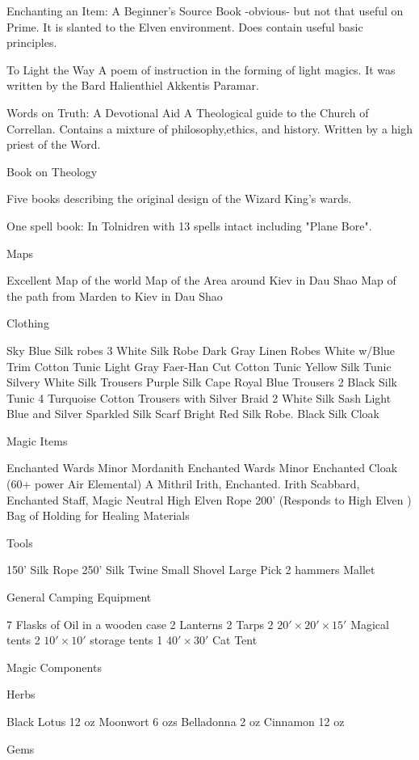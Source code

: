 Enchanting an Item: A Beginner's Source Book
-obvious- but not that
useful on Prime. It is slanted to the  Elven environment. Does
contain useful basic principles.

To Light the Way
A poem of instruction in the forming of light magics. It was written
by the Bard Halienthiel Akkentis Paramar.

Words on Truth: A Devotional Aid
A Theological guide to the Church
of Correllan. Contains a mixture of philosophy,ethics, and history. Written
by a high priest of the Word.

Book on Theology


Five books describing the original design of the Wizard King's
wards.

One spell book: In Tolnidren with 13 spells intact including 
"Plane Bore".

Maps


Excellent Map of the world
Map of the Area around Kiev in Dau Shao
Map of the path from Marden to Kiev in Dau Shao


Clothing


Sky Blue Silk robes  3
White Silk Robe
Dark Gray Linen Robes
White w/Blue Trim Cotton Tunic
Light Gray Faer-Han Cut Cotton Tunic
Yellow Silk Tunic
Silvery White Silk Trousers
Purple Silk Cape
Royal Blue Trousers  2
Black Silk Tunic  4
Turquoise Cotton Trousers with Silver Braid  2
White Silk Sash
Light Blue and Silver Sparkled Silk Scarf
Bright Red Silk Robe.
Black Silk Cloak



Magic Items


Enchanted Wards Minor
Mordanith Enchanted Wards Minor
Enchanted Cloak (60+ power Air Elemental)
A Mithril Irith, Enchanted.
Irith Scabbard, Enchanted
Staff, Magic Neutral
High Elven Rope 200' (Responds to High Elven )
Bag of Holding for Healing Materials


Tools


150' Silk Rope
250' Silk Twine
Small Shovel
Large Pick
2 hammers
Mallet


General Camping Equipment


7 Flasks of Oil in a wooden case
2 Lanterns
2 Tarps
2 $ 20' \times 20' \times 15' $ Magical tents
2 $ 10' \times 10' $ storage tents
1 $ 40' \times 30' $ Cat Tent

Magic Components

Herbs

Black Lotus  12 oz
Moonwort     6 ozs
Belladonna   2 oz
Cinnamon     12 oz

Gems

